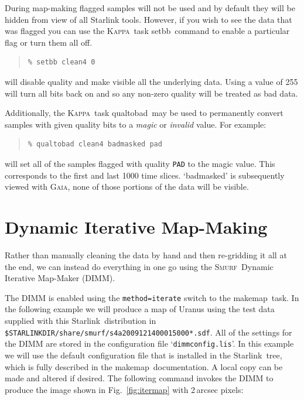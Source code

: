 \documentclass[twoside,11pt]{article}
\newcommand{\htmladdnormallink}[2]{#1}
\newcommand{\xref}[3]{#1}
\newcommand{\xlabel}[1]{}
\renewcommand{\_}{\texttt{\symbol{95}}}
\newenvironment{myquote}{\begin{quote}\begin{small}}{\end{small}\end{quote}}
\newcommand{\starlink}{\htmladdnormallink{Starlink}{http://starlink.jach.hawaii.edu}}
\newcommand{\Kappa}{\xref{\textsc{Kappa}}{sun95}{}}
\newcommand{\gaia}{\xref{\textsc{Gaia}}{sun214}{}}
\newcommand{\smurf}{\xref{\textsc{Smurf}}{sun258}{}}
\newcommand{\task}[1]{\textsf{#1}}
\newcommand{\makemap}{\xref{\task{makemap}}{sun258}{MAKEMAP}}
\newcommand{\qualtobad}{\xref{\task{qualtobad}}{sun95}{QUALTOBAD}}
\newcommand{\setbb}{\xref{\task{setbb}}{sun95}{SETBB}}
\begin{document}
During map-making flagged samples will not be used and by default they
will be hidden from view of all Starlink tools. However, if you wish
to see the data that was flagged you can use the \Kappa\ task \setbb\
command to enable a particular flag or turn them all off.

\begin{myquote}
\begin{verbatim}
% setbb clean4 0
\end{verbatim}
\end{myquote}

will disable quality and make visible all the underlying data. Using a
value of 255 will turn all bits back on and so any non-zero quality will be
treated as bad data.

Additionally, the \Kappa\ task \qualtobad\ may be used to
permanently convert samples with given quality bits to a {\em magic\/} or {\em
  invalid\/} value. For example:

\begin{myquote}
\begin{verbatim}
% qualtobad clean4 badmasked pad
\end{verbatim}
\end{myquote}
%
will set all of the samples flagged with quality \texttt{PAD} to the
magic value. This corresponds to the first and last 1000 time
slices. `badmasked' is subsequently viewed with \gaia, none of those portions
of the data will be visible.

\section{\xlabel{maps}Dynamic Iterative Map-Making}
\label{sec:maps}

Rather than manually cleaning the data by hand and then re-gridding it
all at the end, we can instead do everything in one go using the
\smurf\ Dynamic Iterative Map-Maker (DIMM).

The DIMM is enabled using the \texttt{method=iterate} switch to the
\makemap\ task. In the following example we will produce a map of
Uranus using the test data supplied with this \starlink\ distribution
in \texttt{ \$STARLINK\_DIR/share/smurf/s4a20091214\_00015\_000*.sdf}. All
of the settings for the DIMM are stored in the configuration file
`\texttt{dimmconfig.lis}'. In this example we will use the default
configuration file that is installed in the \starlink\ tree, which is
fully described in the \makemap\ documentation. A local copy can be
made and altered if desired. The following command invokes the DIMM to
produce the image shown in Fig.~\ref{fig:itermap} with 2\,arcsec
pixels:
\end{document}
